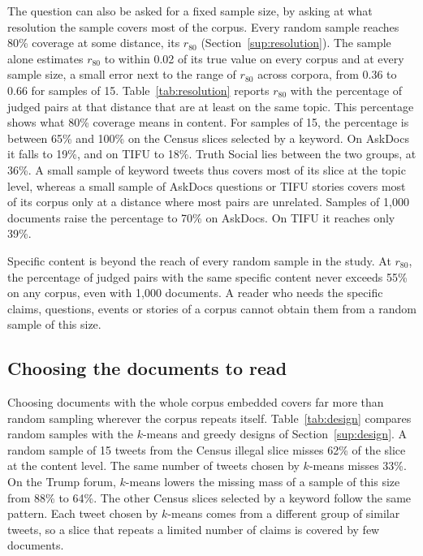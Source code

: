The question can also be asked for a fixed sample size, by asking at what resolution the sample covers most of the corpus. Every random sample reaches 80\% coverage at some distance, its $r_{80}$ (Section~\ref{sup:resolution}). The sample alone estimates $r_{80}$ to within 0.02 of its true value on every corpus and at every sample size, a small error next to the range of $r_{80}$ across corpora, from 0.36 to 0.66 for samples of 15. Table~\ref{tab:resolution} reports $r_{80}$ with the percentage of judged pairs at that distance that are at least on the same topic. This percentage shows what 80\% coverage means in content. For samples of 15, the percentage is between 65\% and 100\% on the Census slices selected by a keyword. On AskDocs it falls to 19\%, and on TIFU to 18\%. Truth Social lies between the two groups, at 36\%. A small sample of keyword tweets thus covers most of its slice at the topic level, whereas a small sample of AskDocs questions or TIFU stories covers most of its corpus only at a distance where most pairs are unrelated. Samples of 1{,}000 documents raise the percentage to 70\% on AskDocs. On TIFU it reaches only 39\%.



Specific content is beyond the reach of every random sample in the study. At $r_{80}$, the percentage of judged pairs with the same specific content never exceeds 55\% on any corpus, even with 1{,}000 documents. A reader who needs the specific claims, questions, events or stories of a corpus cannot obtain them from a random sample of this size.

\subsection{Choosing the documents to read}
\label{sup:design-results}

Choosing documents with the whole corpus embedded covers far more than random sampling wherever the corpus repeats itself. Table~\ref{tab:design} compares random samples with the $k$-means and greedy designs of Section~\ref{sup:design}. A random sample of 15 tweets from the Census illegal slice misses 62\% of the slice at the content level. The same number of tweets chosen by $k$-means misses 33\%. On the Trump forum, $k$-means lowers the missing mass of a sample of this size from 88\% to 64\%. The other Census slices selected by a keyword follow the same pattern. Each tweet chosen by $k$-means comes from a different group of similar tweets, so a slice that repeats a limited number of claims is covered by few documents.

